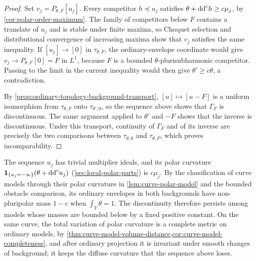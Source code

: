 \begin{proof}
Set $v_j=P_{\theta,F}[u_j]$. Every competitor $h\preceq u_j$ satisfies $\theta+\mathrm{dd}^{\mathrm{c}} h\geq c\mu_j$, by \cref{cor:polar-order-maximum}. The family of competitors below $F$ contains a translate of $u_j$ and is stable under finite maxima, so Choquet selection and distributional convergence of increasing maxima show that $v_j$ satisfies the same inequality. If $[u_j]\to[0]$ in $\tau_{\theta,F}$, the ordinary-envelope coordinate would give $v_j\to P_{\theta,F}[0]=F$ in $L^1$, because $F$ is a bounded $\theta$-plurisubharmonic competitor. Passing to the limit in the current inequality would then give $\theta'\geq c\theta$, a contradiction.

By \cref{prop:ordinary-topology-background-transport}, $[u]\mapsto[u-F]$ is a uniform isomorphism from $\tau_{\theta,F}$ onto $\tau_{\theta',0}$, so the sequence above shows that $\Gamma_F$ is discontinuous. The same argument applied to $\theta'$ and $-F$ shows that the inverse is discontinuous. Under this transport, continuity of $\Gamma_F$ and of its inverse are precisely the two comparisons between $\tau_{\theta,0}$ and $\tau_{\theta,F}$, which proves incomparability.
\end{proof}

The sequence $u_j$ has trivial multiplier ideals, and its polar curvature $\mathbf1_{\{u_j=-\infty\}}(\theta+\mathrm{dd}^{\mathrm{c}} u_j)$ (\cref{sec:local-polar-parts}) is $c\mu_j$. By the classification of curve models through their polar curvature in \cref{lem:curve-polar-model} and the bounded obstacle comparison, its ordinary envelopes in both backgrounds have non-pluripolar mass $1-c$ when $\int_Y\theta=1$. The discontinuity therefore persists among models whose masses are bounded below by a fixed positive constant. On the same curve, the total variation of polar curvature is a complete metric on ordinary models, by \cref{thm:curve-model-volume-distance,cor:curve-model-completeness}, and after ordinary projection it is invariant under smooth changes of background; it keeps the diffuse curvature that the sequence above loses.


